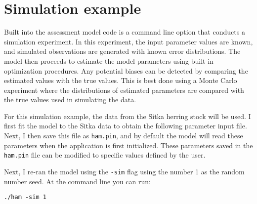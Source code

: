 \documentclass[12pt,letterpaper]{article}
\begin{document}
  
  \section{Simulation example} %
  \label{sec:simulation_example}
  
  Built into the assessment model code is a command line option that conducts a simulation experiment.  In this experiment, the input parameter values are known, and simulated observations are generated with known error distributions. The model then proceeds to estimate the model parameters using built-in optimization procedures.  Any potential biases can be detected by comparing the estimated values with the true values. This is best done using a Monte Carlo experiment where the distributions of estimated parameters are compared with the true values used in simulating the data.

  For this simulation example, the data from the Sitka herring stock will be used. I first fit the model to the Sitka data to obtain the following parameter input file. Next, I then save this file as \texttt{ham.pin}, and by default the model will read these parameters when the application is first initialized. These parameters saved in the \texttt{ham.pin} file can be modified to specific values defined by the user.  

  

  Next, I re-ran the model using the \texttt{-sim} flag using the number 1 as the random number seed.  At the command line you can run:

  \texttt{./ham -sim 1}
\end{document}
